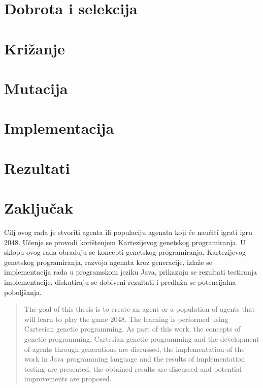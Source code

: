 \documentclass[times, utf8, zavrsni, numeric]{fer}
\begin{document}
\chapter{Dobrota i selekcija}


\chapter{Križanje}


\chapter{Mutacija}


\chapter{Implementacija}


\chapter{Rezultati}


\chapter{Zaključak}





\begin{sazetak}
Cilj ovog rada je stvoriti agenta ili populaciju agenata koji će naučiti igrati igru 2048. Učenje se provodi korištenjem Kartezijevog genetskog programiranja. U sklopu ovog rada obrađuju se koncepti genetskog programiranja, Kartezijevog genetskog programiranja, razvoja agenata kroz generacije, izlaže se implementacija rada u programskom jeziku Java, prikazuju se rezultati testiranja implementacije, diskutiraju se dobiveni rezultati i predlažu se potencijalna poboljšanja.

\end{sazetak}

\begin{abstract}
The goal of this thesis is to create an agent or a population of agents that will learn to play the game 2048. The learning is performed using Cartesian genetic programming. As part of this work, the concepts of genetic programming, Cartesian genetic programming and the development of agents through generations are discussed, the implementation of the work in Java programming language and the results of implementation testing are presented, the obtained results are discussed and potential improvements are proposed.

\end{abstract}
\end{document}
